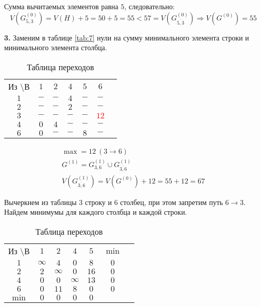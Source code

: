 Сумма вычитаемых элементов равна $5$, следовательно:
\begin{equation*}
V(G_{5,3}^{(0)}) = V(H) + 5 = 50 + 5 = 55 < 57 = V(G_{\overline{5,3}}^{(0)}) \Rightarrow V(G^{(0)}) = 55
\end{equation*}

\textbf{3.} Заменим в таблице \ref{tab:7} нули на сумму минимального элемента строки и минимального элемента столбца.

\begin{table}[H]
\begin{center}
	\def\tabcolsep{15pt}
	\caption{Таблица переходов}
	\label{tab:8}
	\begin{tabular}{|c||c|c|c|c|c|c|}
		\hline
		Из \textbackslash В & $1$ & $2$ & $4$ & $5$ & $6$ \\
		\hhline{|=#=|=|=|=|=|}
		$1$ & $-$ & $-$ & $4$ & $-$ & $-$ \\
		\hline
		$2$ & $-$ & $-$ & $2$ & $-$ & $-$ \\
		\hline
		$3$ & $-$ & $-$ & $-$ & $-$ & \textcolor{red}{\boldmath$12$} \\ 
		\hline
		$4$ & $0$ & $4$ & $-$ & $-$ & $-$ \\
		\hline
		$6$ & $0$ & $-$ & $-$ & $8$ & $-$ \\
		\hline
	\end{tabular}
\end{center}
\end{table}

\begin{gather*}
\max = 12\ (3 \rightarrow 6) \\
G^{(1)} = G_{3,6}^{(1)} \cup G_{\overline{3,6}}^{(1)} \\
V(G_{\overline{3,6}}^{(1)}) = V(G^{(0)}) + 12 = 55 + 12 = 67
\end{gather*}

Вычеркнем из таблицы $3$ строку и $6$ столбец, при этом запретим путь $6 \rightarrow 3$. Найдем минимумы для каждого столбца и каждой строки.

\begin{table}[H]
\begin{center}
	\def\tabcolsep{15pt}
	\caption{Таблица переходов}
	\label{tab:9}
	\begin{tabular}{|c||c|c|c|c|c|c|}
		\hline
		Из \textbackslash В & $1$ & $2$ & $4$ & $5$ & $\min$ \\
		\hhline{|=#=|=|=|=|=|}
		$1$ & $\infty$ & $4$ & $0$ & $8$ & $0$ \\
		\hline
		$2$ & $2$ & $\infty$ & $0$ & $16$ & $0$ \\
		\hline
		$4$ & $0$ & $0$ & $\infty$ & $13$ & $0$ \\
		\hline
		$6$ & $0$ & $11$ & $8$ & $0$ & $0$ \\
		\hhline{|=#=|=|=|=|=|}
		$\min$ & $0$ & $0$ & $0$ & $0$ & \\ 
		\hline
	\end{tabular}
\end{center}
\end{table}

